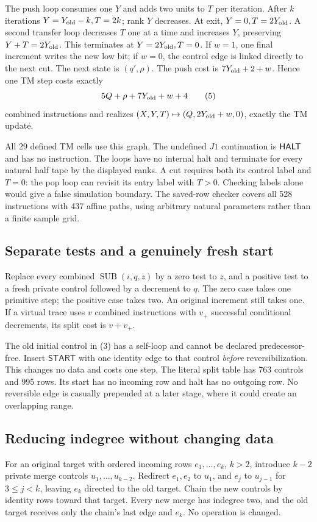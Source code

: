 \documentclass[11pt,a4paper]{article}
\numberwithin{equation}{section}
\newcommand{\START}{\mathsf{START}}
\begin{document}
The push loop consumes one $Y$ and adds two units to $T$ per iteration.
After $k$ iterations $Y=Y_{\rm old}-k,T=2k$; rank $Y$ decreases. At exit,
$Y=0,T=2Y_{\rm old}$. A second transfer loop decreases $T$ one at a time and
increases $Y$, preserving $Y+T=2Y_{\rm old}$. This terminates at
$Y=2Y_{\rm old},T=0$. If $w=1$, one final increment writes the new low bit;
if $w=0$, the control edge is linked directly to the next cut. The next state
is $(q',\rho)$. The push cost is $7Y_{\rm old}+2+w$. Hence one TM step costs
exactly
\[
             5Q+\rho+7Y_{\rm old}+w+4                  \tag{5}\label{fpa:ls:eq:tmclock}
\]
combined instructions and realizes
$(X,Y,T)\mapsto(Q,2Y_{\rm old}+w,0)$, exactly the TM update.

All 29 defined TM cells use this graph. The undefined $J1$ continuation is
$\mathsf{HALT}$ and has no instruction. The loops have no internal halt and terminate
for every natural half tape by the displayed ranks. A cut requires both its
control label and $T=0$: the pop loop can revisit its entry label with $T>0$.
Checking labels alone would give a false simulation boundary. The saved-row
checker covers all 528 instructions with 437 affine paths, using arbitrary
natural parameters rather than a finite sample grid.

\subsection{Separate tests and a genuinely fresh start}
Replace every combined $\operatorname{SUB}(i,q,z)$ by a zero test to $z$,
and a positive test to a fresh private control followed by a decrement to
$q$. The zero case takes one primitive step; the positive case takes two.
An original increment still takes one. If a virtual trace uses $v$ combined
instructions with $v_+$ successful conditional decrements, its split cost is
$v+v_+$.

The old initial control in (3) has a self-loop and cannot be declared
predecessor-free. Insert $\START$ with one identity edge to that control
\emph{before} reversibilization. This changes no data and costs one step.
The literal split table has 763 controls and 995 rows. Its start has no
incoming row and halt has no outgoing row. No reversible edge is casually
prepended at a later stage, where it could create an overlapping range.

\subsection{Reducing indegree without changing data}
For an original target with ordered incoming rows $e_1,\ldots,e_k$, $k>2$,
introduce $k-2$ private merge controls $u_1,\ldots,u_{k-2}$. Redirect $e_1,e_2$
to $u_1$, and $e_j$ to $u_{j-1}$ for $3\le j<k$, leaving $e_k$ directed to
the old target. Chain the new controls by identity rows toward that target.
Every new merge has indegree two, and the old target receives only the chain's
last edge and $e_k$. No operation is changed.
\end{document}
